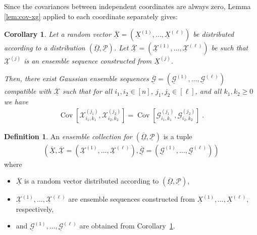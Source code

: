 \documentclass{daj}
\newcommand{\1}{\mathbbm{1}}
\theoremstyle{plain}
\newtheorem{corollary}[theorem]{Corollary}
\theoremstyle{definition}
\newtheorem{definition}[theorem]{Definition}
\DeclareMathOperator*{\Cov}{Cov}
\begin{document}
Since the covariances between independent coordinates are always zero,
Lemma \ref{lem:cov-xg} applied to each coordinate separately gives:
\begin{corollary}
\label{cor:cov-xg}
Let a random vector $\overline{\underline{X}} = 
(\underline{X}^{(1)},\ldots,\underline{X}^{(\ell)})$ be distributed according
to a distribution 
$(\underline{\overline{\Omega}}, \underline{\mathcal{P}})$.
Let $\underline{\overline{\mathcal{X}}} = 
(\underline{\mathcal{X}}^{(1)},\ldots,\underline{\mathcal{X}}^{(\ell)})$ be such
that $\underline{\mathcal{X}}^{(j)}$ is an ensemble sequence constructed 
from $\underline{X}^{(j)}$.

Then, there exist Gaussian ensemble sequences
$\underline{\overline{\mathcal{G}}} = 
(\underline{\mathcal{G}}^{(1)},\ldots,\underline{\mathcal{G}}^{(\ell)})$ 
compatible with $\overline{\underline{\mathcal{X}}}$ such
that for all $i_1, i_2 \in [n]$, $j_1,j_2 \in [\ell]$, and all $k_1,k_2 \geq 0$ we have
\begin{align}\label{eq:70aa}
  \Cov\left[ \mathcal{X}_{i_1, k_1}^{(j_1)}, \mathcal{X}_{i_2, k_2}^{(j_2)} 
  \right]
  = \Cov\left[ 
  \mathcal{G}_{i_1, k_1}^{(j_1)}, \mathcal{G}_{i_2, k_2}^{(j_2)} \right] \; .
\end{align}
\end{corollary}

\begin{definition}
An \emph{ensemble collection for 
$(\overline{\underline{\Omega}}, \underline{\mathcal{P}})$}
is a tuple \begin{align*}
\left(\overline{\underline{X}},
\underline{\overline{\mathcal{X}}} = (\underline{\mathcal{X}}^{(1)}, \ldots,
\underline{\mathcal{X}}^{(\ell)}),
\underline{\overline{\mathcal{G}}} = (\underline{\mathcal{G}}^{(1)}, \ldots,
\underline{\mathcal{G}}^{(\ell)})\right)
\end{align*}
where 
\begin{itemize}
\item $\overline{\underline{X}}$ is a random vector
distributed according to $(\overline{\underline{\Omega}}, 
\underline{\mathcal{P}})$,
\item 
$\underline{\mathcal{X}}^{(1)}, \ldots, \underline{\mathcal{X}}^{(\ell)}$
are ensemble sequences constructed from 
$\underline{X}^{(1)}, \ldots, \underline{X}^{(\ell)}$, respectively, 
\item and 
$\underline{\mathcal{G}}^{(1)}, \ldots, \underline{\mathcal{G}}^{(\ell)}$
are obtained from Corollary~\ref{cor:cov-xg}.
\end{itemize}
\end{definition}
\end{document}

